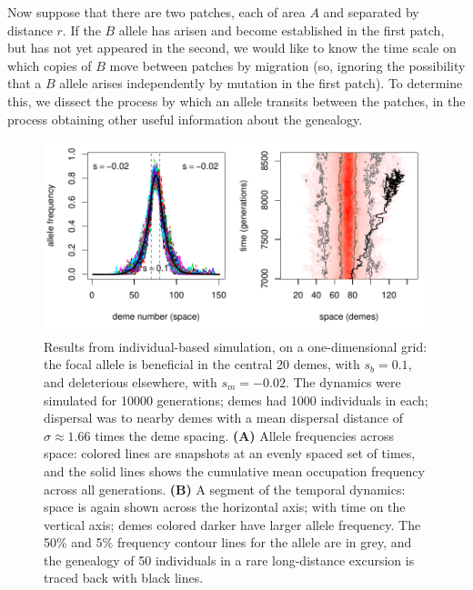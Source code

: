 \documentclass{article}
\begin{document}
Now suppose that there are two patches, each of area $A$ and separated by distance $r$. 
If the $B$ allele has arisen and become established in the first patch, but has not yet appeared in the second,
we would like to know the time scale on which copies of $B$ move between patches by migration
(so, ignoring the possibility that a $B$ allele arises independently by mutation in the first patch).
To determine this, we dissect the process by which an allele transits between the patches,
in the process obtaining other useful information about the genealogy.

\begin{figure}[ht!]
  \begin{center}
    \includegraphics{sim-snapshots}
  \end{center}
  \caption{
  Results from individual-based simulation, on a one-dimensional grid:
  the focal allele is beneficial in the central 20 demes, with $s_b=0.1$,
  and deleterious elsewhere, with $s_m=-0.02$.
  The dynamics were simulated for 10000 generations; demes had 1000 individuals in each;
  dispersal was to nearby demes with a mean dispersal distance of $\sigma \approx 1.66$  times the deme spacing.
  \textbf{(A)} Allele frequencies across space: colored lines are snapshots at an evenly spaced set of times,
  and the solid lines shows the cumulative mean occupation frequency across all generations.
  \textbf{(B)} A segment of the temporal dynamics: space is again shown across the horizontal axis;
  with time on the vertical axis; demes colored darker have larger allele frequency.
  The 50\% and 5\% frequency contour lines for the allele are in grey,
  and the genealogy of 50 individuals in a rare long-distance excursion is traced back with black lines.
  \label{fig:sim_snapshots}
  }
\end{figure}
\end{document}
